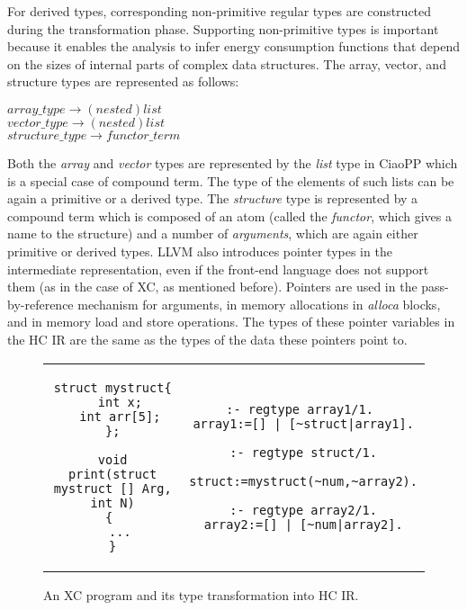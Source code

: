 \documentclass{llncs}
\newcommand{\hcir}{HC IR\xspace}
\newcommand{\ciaopp}{CiaoPP\xspace}
\newcommand{\figend}{\vspace*{-5mm}}
\begin{document}
For derived types, corresponding non-primitive regular types are
constructed during the transformation phase. Supporting non-primitive
types is important because it enables the analysis to infer energy
consumption functions that depend on the sizes of internal parts of
complex data structures. 
The array, vector, and structure types are represented as
follows:
\begin{center}
$array\_type\rightarrow (nested) list$\\
$vector\_type\rightarrow (nested) list$\\
$structure\_type\rightarrow functor\_term$ 
\end{center}
Both the \textit{array} and \textit{vector} types are represented by
the \textit{list} type in \ciaopp which is a special case of compound
term. The type of the elements of such lists can be again a primitive
or a derived type. The \textit{structure} type is represented by a
compound term which is composed of an atom (called the
\textit{functor}, which gives a name to the structure) and a number of
\textit{arguments}, which are again either primitive or derived
types. LLVM also introduces pointer types in the intermediate
representation, even if the front-end language does not support them
(as in the case of XC, as mentioned before). Pointers are used in the
pass-by-reference mechanism for arguments, in memory allocations in
\textit{alloca} blocks, and in memory load and store operations. The
types of these pointer variables in the \hcir are the same as the
types of the data these pointers point to.


\begin{figure}[ht]

\begin{tabular}{  c | c  }
\begin{lstlisting}[language=xc]
struct mystruct{
  int x;
  int arr[5];
};

void print(struct mystruct [] Arg, int N)
{ 
  ...
}
\end{lstlisting}

&

\begin{lstlisting}[language=ciao]
:- regtype array1/1. 
array1:=[] | [~struct|array1].

:- regtype struct/1.

struct:=mystruct(~num,~array2).

:- regtype array2/1.
array2:=[] | [~num|array2].
\end{lstlisting}
\end{tabular}

\caption{An XC program and its type transformation into \hcir.}
\label{xc2regtypes}
\figend
\end{figure}
\end{document}
